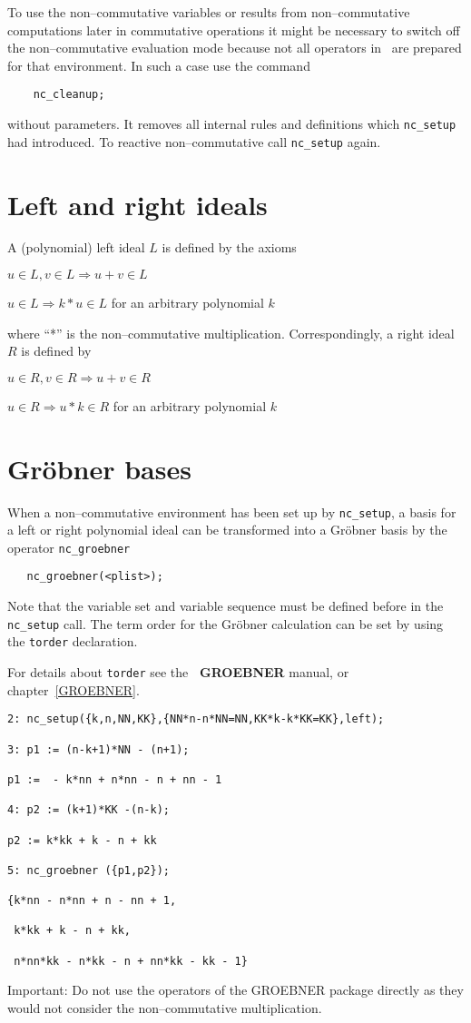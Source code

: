 To use the non--commutative variables or results from
non--commutative computations later in commutative operations
it might be necessary to switch off the non--commutative
evaluation mode because not
all operators in \REDUCE\ are prepared for that environment. In
such a case use the command
\begin{verbatim}
    nc_cleanup;
\end{verbatim}
without parameters. It removes all internal rules and definitions
which {\tt nc\_setup} had introduced. To reactive non--commutative
call {\tt nc\_setup} again.

\section{Left and right ideals}

A (polynomial) left ideal $L$ is defined by the axioms

$u \in L, v \in L \Longrightarrow u+v \in L$

$u \in L \Longrightarrow k*u \in L$ for an arbitrary polynomial $k$

where ``*'' is the non--commutative multiplication. Correspondingly,
a right ideal $R$ is defined by

$u \in R, v \in R \Longrightarrow u+v \in R$

$u \in R \Longrightarrow u*k \in R$ for an arbitrary polynomial $k$

\section{Gr\"obner bases}

When a non--commutative environment has been set up
by {\tt nc\_setup}, a basis for a left or right polynomial ideal
can be transformed into a Gr\"obner basis by the operator
{\tt nc\_groebner}
\begin{verbatim}
   nc_groebner(<plist>);
\end{verbatim}
Note that the variable set and variable sequence must be
defined before in the {\tt nc\_setup} call. The term order
for the Gr\"obner calculation can be set by using the
{\tt torder} declaration.

For details about {\tt torder}
see the {\bf \REDUCE\ GROEBNER} manual, or chapter~\ref{GROEBNER}.
\begin{verbatim}
2: nc_setup({k,n,NN,KK},{NN*n-n*NN=NN,KK*k-k*KK=KK},left);

3: p1 := (n-k+1)*NN - (n+1);

p1 :=  - k*nn + n*nn - n + nn - 1

4: p2 := (k+1)*KK -(n-k);

p2 := k*kk + k - n + kk

5: nc_groebner ({p1,p2});

{k*nn - n*nn + n - nn + 1,

 k*kk + k - n + kk,

 n*nn*kk - n*kk - n + nn*kk - kk - 1}

\end{verbatim}
Important: Do not use the operators of the GROEBNER
package directly as they would not consider the non--commutative
multiplication.

